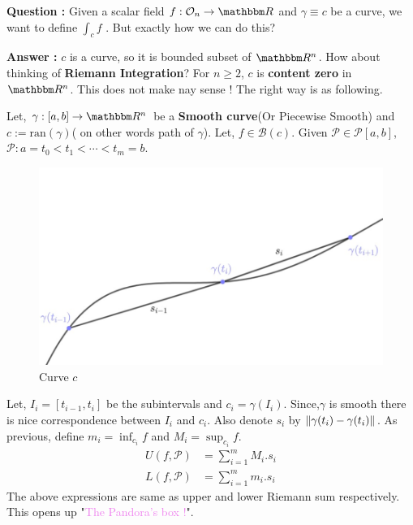 \documentclass[Analysis-3]{subfiles}
\begin{document}
\textbf{Question :} Given a scalar field $f : \mathcal{O}_n \to \R$ and $\gamma \equiv c$ be a curve, we want to define $\int_c f$ . But exactly how we can do this?

\textbf{Answer :} $c$ is a curve, so it is bounded subset of $\R^n$. How about thinking of \textbf{Riemann Integration}? For $n \ge 2$, $c$ is \textbf{content zero} in $\R^n$. This does not make nay sense ! The right way is as following.

\vspace*{0.5cm}

Let, $\gamma :[a,b]\to \R^n$ be a \textbf{Smooth curve}(Or Piecewise Smooth) and $c:= \text{ran}(\gamma)$( on other words path of $\gamma$). Let, $f \in \mathscr{B}(c)$. Given $\mathcal{P} \in \mathscr{P}[a,b]$, $\mathcal{P} : a = t_0<t_1<\cdots <t_m = b$.

\vspace{0.2cm}

\begin{figure}
    \centering
    \includegraphics[width=.98\linewidth]{figures/lec-23.1.png}
    \caption{Curve $c$}
\end{figure}
Let, $I_i = [t_{i-1},t_i]$ be the subintervals and $c_i = \gamma(I_i)$.
Since,$\gamma$ is smooth there is nice correspondence between $I_i$ and $c_i$. Also denote $s_i$ by $\norm{\gamma(t_i) - \gamma(t_i)}$. As previous, define $m_i = \inf_{c_i}f$ and $M_i = \sup_{c_i}f$.
\begin{align*}
    U(f,\mathcal{P}) & = \sum_{i=1}^{m}M_i.s_i \\
    L(f,\mathcal{P}) & = \sum_{i=1}^{m}m_i.s_i
\end{align*}
The above expressions are same as upper and
\vspace{0.05cm}
lower Riemann sum respectively. This opens up "\textcolor{violet}{The Pandora's box !}".
\vspace{0.3cm}
\end{document}
